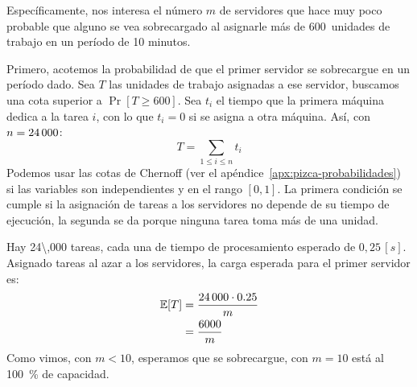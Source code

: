   Específicamente,
  nos interesa el número \(m\) de servidores que hace muy poco probable
  que alguno se vea sobrecargado al asignarle
  más de \num[group-digits = true]{600}~unidades de trabajo
  en un período de \num[group-digits = true]{10} minutos.

  Primero,
  acotemos la probabilidad de que el primer servidor se sobrecargue
  en un período dado.
  Sea \(T\) las unidades de trabajo asignadas a ese servidor,
  buscamos una cota superior a \(\Pr[T \ge 600]\).
  Sea \(t_i\) el tiempo que la primera máquina dedica a la tarea \(i\),
  con lo que \(t_i = 0\) si se asigna a otra máquina.
  Así,
  con \(n = \num[group-digits = true]{24\,000}\):
  \begin{equation*}
    T
      = \sum_{1 \le i \le n} t_i
  \end{equation*}
  Podemos usar las cotas de Chernoff
  (ver el apéndice~\ref{apx:pizca-probabilidades})
  si las variables son independientes
  y en el rango \([0, 1]\).
  La primera condición se cumple
  si la asignación de tareas a los servidores
  no depende de su tiempo de ejecución,
  la segunda se da porque ninguna tarea toma más de una unidad.

  Hay \num[group-digits = true]{24\,000} tareas,
  cada una de tiempo de procesamiento esperado de \(0,25\,[s]\).
  Asignado tareas al azar a los servidores,
  la carga esperada para el primer servidor es:
  \begin{align*}
    \Exp[T]
      &= \frac{\num[group-digits = true]{24\,000}
                 \cdot \num[group-digits = true]{0,25}}{m} \\
      &= \frac{\num[group-digits = true]{6\,000}}{m}
  \end{align*}
  Como vimos,
  con \(m < 10\),
  esperamos que se sobrecargue,
  con \(m = 10\) está al \SI{100}{\percent} de capacidad.

